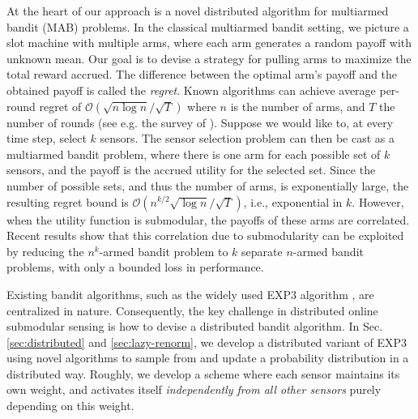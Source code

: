 \documentclass{sig-alternate-dan}
\numberwithin{equation}{section}
\newcommand{\algofont}[1]{\textsc{#1}}
\newcommand{\cO}{\mathcal{O}}
\newcommand{\EXPthree}{{\algofont{EXP3}}\xspace}
\newcommand{\ignore}[1]{}
\renewcommand{\paragraph}[1]{\vspace{3mm}\noindent{\bf #1.} }
\begin{document}
\paragraph{A bandit approach toward sensor selection} 
At the heart of our approach is a novel distributed algorithm for
multiarmed bandit (MAB) problems.  In the classical multiarmed bandit
\cite{robbins52some} setting, we picture a slot machine with multiple
arms, where each arm generates a random payoff with unknown mean.  Our
goal is to devise a strategy for pulling arms to maximize the total
reward accrued.  The difference between the optimal arm's payoff and
the obtained payoff is called the \emph{regret}. Known algorithms can achieve
average per-round regret of $\cO(\sqrt{n \log n} / \sqrt{T})$ where
$n$ is the number of arms, and $T$ the number of rounds (see e.g. the
survey of \cite{foster99}).  Suppose we would like to, at every time step,
select $k$ sensors.  The sensor selection problem can then be cast as
a multiarmed bandit problem, where there is one arm for each possible
set of $k$ sensors, and the payoff is the accrued utility for the
selected set.  Since the number of possible sets, and thus the number
of arms, is exponentially large,
%
%
%
the resulting regret bound is $\cO(n^{k/2}\sqrt{\log n} /
\sqrt{T})$, i.e., exponential in $k$.  However, when the utility
function is submodular, the payoffs of these arms are correlated.
Recent results \cite{streeter08} show that this correlation due to
submodularity can be exploited by reducing the $n^{k}$-armed bandit
problem to $k$ separate $n$-armed bandit problems, with only a bounded loss in
performance. 
%
%
%
%
%
\ignore{
 However, the existing no-regret algorithms for bandit
 optimization are centralized in nature: A centralized processor
 maintains a set of ``weights'' associated with each arm, which depend
 on the performance of the arms in past rounds.  Arms are then pulled
 at random by interpreting the weights as probabilities.The key
 question in distributed online submodular sensing is thus how to
 perform this sampling in a distributed fashion.  In this paper, we
 develop a scheme where each sensor maintains their own weights, and
 activates itself \emph{independently from all other sensors} purely
 depending on this weight. 
 }
%
Existing bandit algorithms, such as the widely used \EXPthree
algorithm \cite{auer02}, are centralized in nature. Consequently, the
key challenge in distributed online submodular sensing is how to
devise a distributed bandit algorithm. In Sec. \ref{sec:distributed}
and \ref{sec:lazy-renorm}, we develop a distributed variant of EXP3
using novel algorithms to sample from and update a probability
distribution in a distributed way. Roughly, we develop a scheme where
each sensor maintains its own weight, and activates itself
\emph{independently from all other sensors} purely depending on this
weight.
\end{document}
